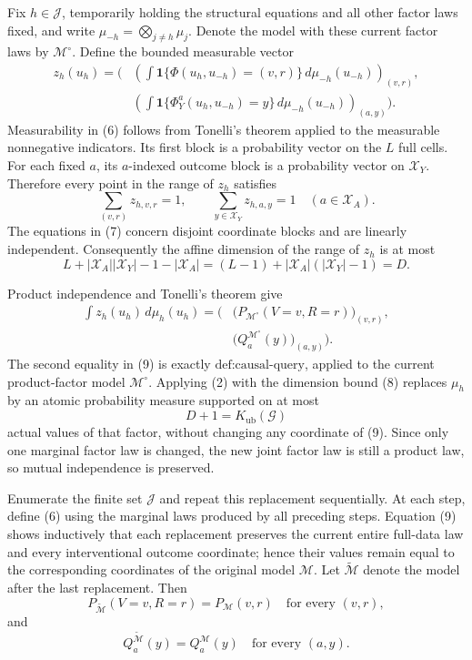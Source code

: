 Fix \(h\in\mathcal J\), temporarily holding the structural equations and all other factor laws fixed, and write \(\mu_{-h}=\bigotimes_{j\neq h}\mu_j\).  Denote the model with these current factor laws by \(\mathcal M^{\circ}\).  Define the bounded measurable vector
\[
\begin{aligned}
z_h(u_h)=\Bigg(&
\left(
\int \mathbf 1\{\Phi(u_h,u_{-h})=(v,r)\}\,d\mu_{-h}(u_{-h})
\right)_{(v,r)},\\
&\left(
\int \mathbf 1\{\Phi_Y^a(u_h,u_{-h})=y\}\,d\mu_{-h}(u_{-h})
\right)_{(a,y)}
\Bigg).
\end{aligned}
\tag{6}
\]
Measurability in (6) follows from Tonelli's theorem applied to the measurable nonnegative indicators.  Its first block is a probability vector on the \(L\) full cells.  For each fixed \(a\), its \(a\)-indexed outcome block is a probability vector on \(\mathcal X_Y\).  Therefore every point in the range of \(z_h\) satisfies
\[
\sum_{(v,r)}z_{h,v,r}=1,
\qquad
\sum_{y\in\mathcal X_Y}z_{h,a,y}=1
\quad(a\in\mathcal X_A).
\tag{7}
\]
The equations in (7) concern disjoint coordinate blocks and are linearly independent.  Consequently the affine dimension of the range of \(z_h\) is at most
\[
L+|\mathcal X_A||\mathcal X_Y|-1-|\mathcal X_A|
=(L-1)+|\mathcal X_A|(|\mathcal X_Y|-1)=D.
\tag{8}
\]

Product independence and Tonelli's theorem give
\[
\begin{aligned}
\int z_h(u_h)\,d\mu_h(u_h)
=\Big(&\bigl(P_{\mathcal M^{\circ}}(V=v,R=r)\bigr)_{(v,r)},\\
&\bigl(Q_a^{\mathcal M^{\circ}}(y)\bigr)_{(a,y)}\Big).
\end{aligned}
\tag{9}
\]
The second equality in (9) is exactly \(\text{def:causal-query}\), applied to the current product-factor model \(\mathcal M^{\circ}\).  Applying (2) with the dimension bound (8) replaces \(\mu_h\) by an atomic probability measure supported on at most
\[
D+1=K_{\mathrm{ub}}(\mathcal G)
\tag{10}
\]
actual values of that factor, without changing any coordinate of (9).  Since only one marginal factor law is changed, the new joint factor law is still a product law, so mutual independence is preserved.

Enumerate the finite set \(\mathcal J\) and repeat this replacement sequentially.  At each step, define (6) using the marginal laws produced by all preceding steps.  Equation (9) shows inductively that each replacement preserves the current entire full-data law and every interventional outcome coordinate; hence their values remain equal to the corresponding coordinates of the original model \(\mathcal M\).  Let \(\widetilde{\mathcal M}\) denote the model after the last replacement.  Then
\[
P_{\widetilde{\mathcal M}}(V=v,R=r)=P_{\mathcal M}(v,r)
\quad\text{for every }(v,r),
\tag{11}
\]
and
\[
Q_a^{\widetilde{\mathcal M}}(y)=Q_a^{\mathcal M}(y)
\quad\text{for every }(a,y).
\tag{12}
\]

